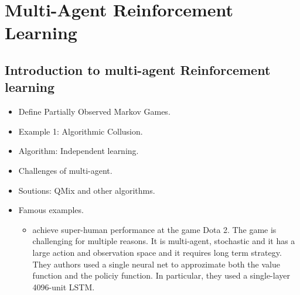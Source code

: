 \documentclass[11pt,english]{article}
\begin{document}
\section{Multi-Agent Reinforcement Learning}

\subsection{Introduction to multi-agent Reinforcement learning}
\begin{itemize}
\item Define Partially Observed Markov Games.
\item Example 1: Algorithmic Collusion.
\item Algorithm: Independent learning.
\item Challenges of multi-agent.
\item Soutions: QMix and other algorithms. 
\item Famous examples.
\begin{itemize}
	
\item \citet{berner2019} achieve super-human performance at the game Dota 2. The game is challenging for multiple reasons. It is multi-agent, stochastic and it has a large action and observation space and it requires long term strategy. They authors used a single neural net to approzimate both the value function and the policiy function. In particular, they used a single-layer 4096-unit LSTM.


\end{itemize}
\end{itemize}
\end{document}
